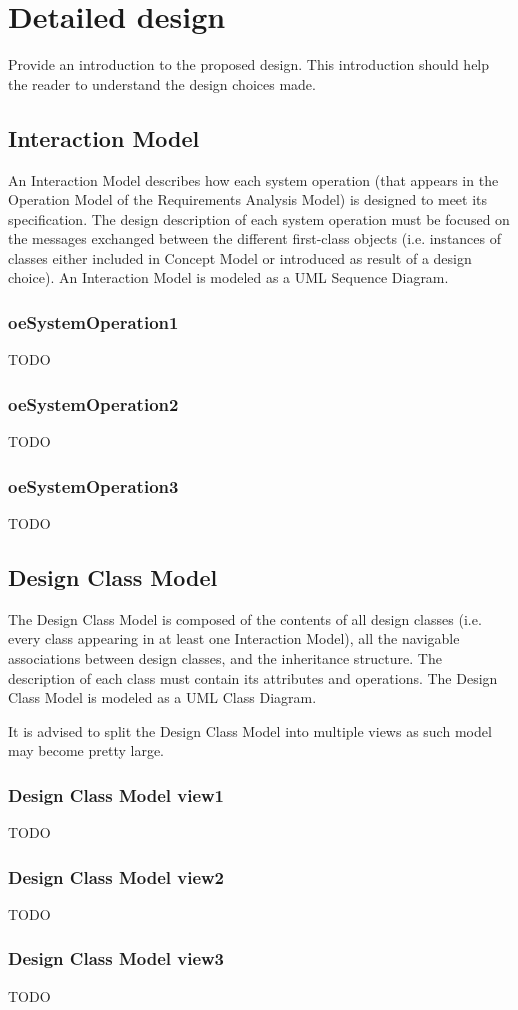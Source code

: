 \chapter{Detailed design}
\label{chap:detDesign}


Provide an introduction to the proposed design. This introduction should help
the reader to understand the design choices made.


\section{Interaction Model}
An Interaction Model describes how each \gls{system operation} (that appears in the
Operation Model of the \msrmessir Requirements Analysis Model) is designed to meet
its specification. The design description of each system operation must be
focused on the messages exchanged between the different first-class objects
(i.e. instances of classes either included in Concept Model or introduced as
result of a design choice). An Interaction Model is modeled as a UML Sequence
Diagram.


\subsection{oeSystemOperation1}
TODO


\subsection{oeSystemOperation2}
TODO


\subsection{oeSystemOperation3}
TODO



\section{Design Class Model}
The Design Class Model is composed of the contents of all design classes (i.e.
every class appearing in at least one Interaction Model), all the navigable associations between design
classes, and the inheritance structure. The description of each class must
contain its attributes and operations. The Design Class Model is modeled as a
UML Class Diagram. 

It is advised to split the Design Class Model into multiple views as such model
may become pretty large. 
	

\subsection{Design Class Model view1}
TODO


\subsection{Design Class Model view2}
TODO



\subsection{Design Class Model view3}
TODO